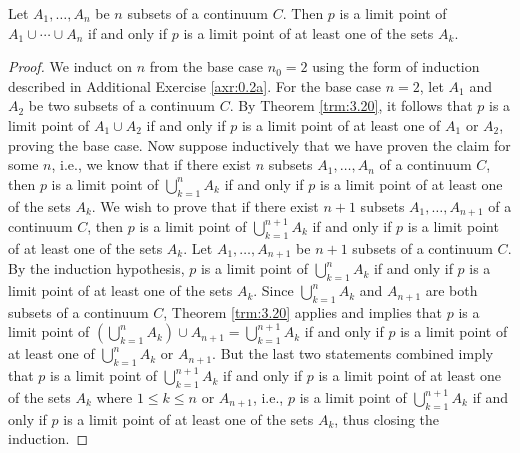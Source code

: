 \documentclass[../main.tex]{subfiles}
\begin{document}
\begin{corollary}\label{cly:3.21}
    Let $A_1,\dots,A_n$ be $n$ subsets of a continuum $C$. Then $p$ is a limit point of $A_1\cup\cdots\cup A_n$ if and only if $p$ is a limit point of at least one of the sets $A_k$.
    \begin{proof}
        We induct on $n$ from the base case $n_0=2$ using the form of induction described in Additional Exercise \ref{axr:0.2a}. For the base case $n=2$, let $A_1$ and $A_2$ be two subsets of a continuum $C$. By Theorem \ref{trm:3.20}, it follows that $p$ is a limit point of $A_1\cup A_2$ if and only if $p$ is a limit point of at least one of $A_1$ or $A_2$, proving the base case. Now suppose inductively that we have proven the claim for some $n$, i.e., we know that if there exist $n$ subsets $A_1,\dots,A_n$ of a continuum $C$, then $p$ is a limit point of $\bigcup_{k=1}^nA_k$ if and only if $p$ is a limit point of at least one of the sets $A_k$. We wish to prove that if there exist $n+1$ subsets $A_1,\dots,A_{n+1}$ of a continuum $C$, then $p$ is a limit point of $\bigcup_{k=1}^{n+1}A_k$ if and only if $p$ is a limit point of at least one of the sets $A_k$. Let $A_1,\dots,A_{n+1}$ be $n+1$ subsets of a continuum $C$. By the induction hypothesis, $p$ is a limit point of $\bigcup_{k=1}^nA_k$ if and only if $p$ is a limit point of at least one of the sets $A_k$. Since $\bigcup_{k=1}^nA_k$ and $A_{n+1}$ are both subsets of a continuum $C$, Theorem \ref{trm:3.20} applies and implies that $p$ is a limit point of $\left( \bigcup_{k=1}^nA_k \right)\cup A_{n+1}=\bigcup_{k=1}^{n+1}A_k$ if and only if $p$ is a limit point of at least one of $\bigcup_{k=1}^nA_k$ or $A_{n+1}$. But the last two statements combined imply that $p$ is a limit point of $\bigcup_{k=1}^{n+1}A_k$ if and only if $p$ is a limit point of at least one of the sets $A_k$ where $1\leq k\leq n$ or $A_{n+1}$, i.e., $p$ is a limit point of $\bigcup_{k=1}^{n+1}A_k$ if and only if $p$ is a limit point of at least one of the sets $A_k$, thus closing the induction.
    \end{proof}
\end{corollary}
\end{document}

